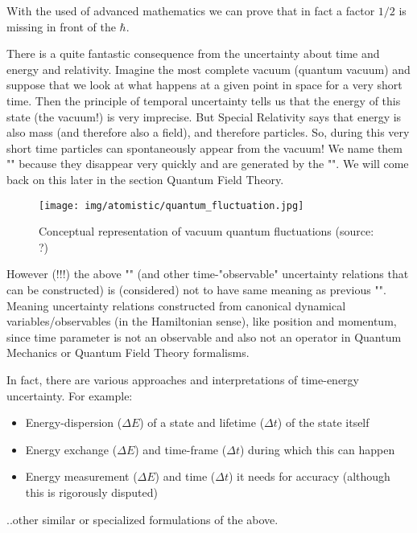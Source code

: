 \begin{enumerate}
		\begin{tcolorbox}[title=Remark,colframe=black,arc=10pt]
		With the used of advanced mathematics we can prove that in fact a factor $1/2$ is missing in front of the $\hbar$.
		\end{tcolorbox}
		There is a quite fantastic consequence from the uncertainty about time and energy and relativity. Imagine the most complete vacuum (quantum vacuum) and suppose that we look at what happens at a given point in space for a very short time. Then the principle of temporal uncertainty tells us that the energy of this state (the vacuum!) is very imprecise. But Special Relativity says that energy is also mass (and therefore also a field), and therefore particles. So, during this very short time particles can spontaneously appear from the vacuum! We name them "" because they disappear very quickly and are generated by the "". We will come back on this later in the section Quantum Field Theory.
		\begin{figure}[H]
			\centering
			\texttt{[image: img/atomistic/quantum\_fluctuation.jpg]}
			\caption[Conceptual representation of vacuum quantum fluctuations]{Conceptual representation of vacuum quantum fluctuations (source: ?)}
		\end{figure}
		However (!!!) the above "" (and other time-"observable" uncertainty relations that can be constructed) is (considered) not to have same meaning as previous "". Meaning uncertainty relations constructed from canonical dynamical variables/observables (in the Hamiltonian sense), like position and momentum, since time parameter is not an observable and also not an operator in Quantum Mechanics or Quantum Field Theory formalisms.
	
		In fact, there are various approaches and interpretations of time-energy uncertainty. For example:
		\begin{itemize}
			\item Energy-dispersion ($\Delta E$) of a state and lifetime ($\Delta t$) of the state itself
			\item Energy exchange ($\Delta E$) and time-frame ($\Delta t$) during which this can happen
			\item Energy measurement ($\Delta E$) and time ($\Delta t$) it needs for accuracy (although this is rigorously disputed)
		\end{itemize}
		..other similar or specialized formulations of the above.
		

\end{enumerate}
